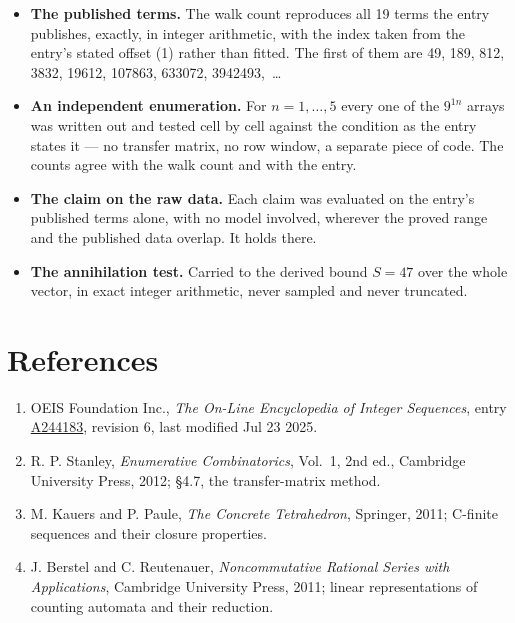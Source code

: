 \documentclass[11pt]{article}
\theoremstyle{definition}
\begin{document}
\begin{itemize}

\item {\bfseries The published terms.} The walk count reproduces all 19 terms the entry publishes, exactly, in integer arithmetic, with the index taken from the entry's stated offset (1) rather than fitted. The first of them are 49, 189, 812, 3832, 19612, 107863, 633072, 3942493,~\dots

\item {\bfseries An independent enumeration.} For $n = 1,\dots,5$ every one of the $9^{1n}$ arrays was written out and tested cell by cell against the condition as the entry states it --- no transfer matrix, no row window, a separate piece of code. The counts agree with the walk count and with the entry.

\item {\bfseries The claim on the raw data.} Each claim was evaluated on the entry's published terms alone, with no model involved, wherever the proved range and the published data overlap. It holds there.

\item {\bfseries The annihilation test.} Carried to the derived bound $S = 47$ over the whole vector, in exact integer arithmetic, never sampled and never truncated.

\end{itemize}

\section{References}

\begin{enumerate}

\item OEIS Foundation Inc., \emph{The On-Line Encyclopedia of Integer Sequences}, entry \href{https://oeis.org/A244183}{A244183}, revision 6, last modified Jul 23 2025.

\item R. P. Stanley, \emph{Enumerative Combinatorics}, Vol.~1, 2nd ed., Cambridge University Press, 2012; \S4.7, the transfer-matrix method.

\item M. Kauers and P. Paule, \emph{The Concrete Tetrahedron}, Springer, 2011; C-finite sequences and their closure properties.

\item J. Berstel and C. Reutenauer, \emph{Noncommutative Rational Series with Applications}, Cambridge University Press, 2011; linear representations of counting automata and their reduction.

\end{enumerate}
\end{document}
